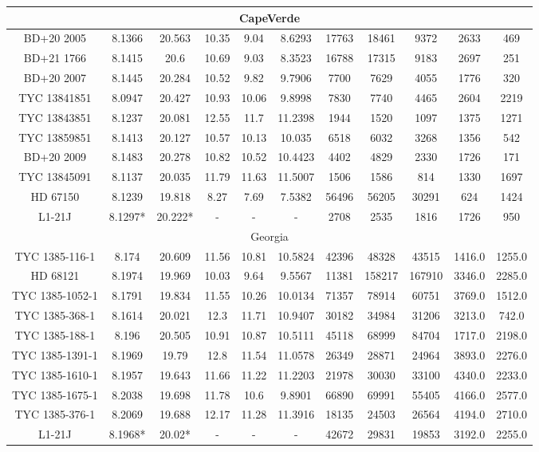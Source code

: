 \begin{table*}
{\begin{tabular}{c|cc|ccc|ccc|cc}
\hline
\multicolumn{11}{c}{CapeVerde}\\
\hline
BD+20 2005 & 8.1366 & 20.563 & 10.35 & 9.04 & 8.6293 & 17763 & 18461 & 9372 & 2633 & 469\\
BD+21 1766 & 8.1415 & 20.6 & 10.69 & 9.03 & 8.3523 & 16788 & 17315 & 9183 & 2697 & 251\\
BD+20 2007 & 8.1445 & 20.284 & 10.52 & 9.82 & 9.7906 & 7700 & 7629 & 4055 & 1776 & 320\\
TYC 13841851 & 8.0947 & 20.427 & 10.93 & 10.06 & 9.8998 & 7830 & 7740 & 4465 & 2604 & 2219\\
TYC 13843851 & 8.1237 & 20.081 & 12.55 & 11.7 & 11.2398 & 1944 & 1520 & 1097 & 1375 & 1271\\
TYC 13859851 & 8.1413 & 20.127 & 10.57 & 10.13 & 10.035 & 6518 & 6032 & 3268 & 1356 & 542\\
BD+20 2009 & 8.1483 & 20.278 & 10.82 & 10.52 & 10.4423 & 4402 & 4829 & 2330 & 1726 & 171\\
TYC 13845091 & 8.1137 & 20.035 & 11.79 & 11.63 & 11.5007 & 1506 & 1586 & 814 & 1330 & 1697\\
HD 67150 & 8.1239 & 19.818 & 8.27 & 7.69 & 7.5382 & 56496 & 56205 & 30291 & 624 & 1424\\
L1-21J & 8.1297* & 20.222* & - & - & - & 2708 & 2535 & 1816 & 1726 & 950\\

\hline
\multicolumn{11}{c}{Georgia}\\
\hline
TYC 1385-116-1 & 8.174 & 20.609 & 11.56 & 10.81 & 10.5824 & 42396 & 48328 & 43515 & 1416.0 & 1255.0\\
HD 68121 & 8.1974 & 19.969 & 10.03 & 9.64 & 9.5567 & 11381 & 158217 & 167910 & 3346.0 & 2285.0\\
TYC 1385-1052-1 & 8.1791 & 19.834 & 11.55 & 10.26 & 10.0134 & 71357 & 78914 & 60751 & 3769.0 & 1512.0\\
TYC 1385-368-1 & 8.1614 & 20.021 & 12.3 & 11.71 & 10.9407 & 30182 & 34984 & 31206 & 3213.0 & 742.0\\
TYC 1385-188-1 & 8.196 & 20.505 & 10.91 & 10.87 & 10.5111 & 45118 & 68999 & 84704 & 1717.0 & 2198.0\\
TYC 1385-1391-1 & 8.1969 & 19.79 & 12.8 & 11.54 & 11.0578 & 26349 & 28871 & 24964 & 3893.0 & 2276.0\\
TYC 1385-1610-1 & 8.1957 & 19.643 & 11.66 & 11.22 & 11.2203 & 21978 & 30030 & 33100 & 4340.0 & 2233.0\\
TYC 1385-1675-1 & 8.2038 & 19.698 & 11.78 & 10.6 & 9.8901 & 66890 & 69991 & 55405 & 4166.0 & 2577.0\\
TYC 1385-376-1 & 8.2069 & 19.688 & 12.17 & 11.28 & 11.3916 & 18135 & 24503 & 26564 & 4194.0 & 2710.0\\
L1-21J & 8.1968* & 20.02* & - & - & - & 42672 & 29831 & 19853 & 3192.0 & 2255.0\\


\end{tabular}}
\end{table*}
